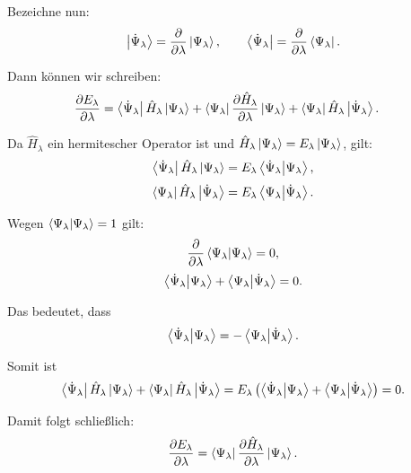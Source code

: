\documentclass[a4paper,12pt]{scrartcl}
\begin{document}
Bezeichne nun:
\begin{equation}
    \ket{\dot{\Psi}_\lambda} = \frac{\partial}{\partial \lambda} \ket{\Psi_\lambda}, \qquad
    \bra{\dot{\Psi}_\lambda} = \frac{\partial}{\partial \lambda} \bra{\Psi_\lambda}.
\end{equation}

Dann können wir schreiben:
\begin{align}
    \frac{\partial E_\lambda}{\partial \lambda}
    &= \bra{\dot{\Psi}_\lambda} \hat{H}_\lambda \ket{\Psi_\lambda}
    + \bra{\Psi_\lambda} \frac{\partial \hat{H}_\lambda}{\partial \lambda} \ket{\Psi_\lambda}
    + \bra{\Psi_\lambda} \hat{H}_\lambda \ket{\dot{\Psi}_\lambda}.
\end{align}

Da $\hat{H}_\lambda$ ein hermitescher Operator ist und $\hat{H}_\lambda \ket{\Psi_\lambda} = E_\lambda \ket{\Psi_\lambda}$, gilt:
\begin{equation}
    \bra{\dot{\Psi}_\lambda} \hat{H}_\lambda \ket{\Psi_\lambda} = E_\lambda \braket{\dot{\Psi}_\lambda}{\Psi_\lambda},
\end{equation}
\begin{equation}
    \bra{\Psi_\lambda} \hat{H}_\lambda \ket{\dot{\Psi}_\lambda} = E_\lambda \braket{\Psi_\lambda}{\dot{\Psi}_\lambda}.
\end{equation}

Wegen $\braket{\Psi_\lambda}{\Psi_\lambda} = 1$ gilt:
\begin{equation}
    \frac{\partial}{\partial \lambda} \braket{\Psi_\lambda}{\Psi_\lambda} = 0,
\end{equation}
\begin{equation}
    \braket{\dot{\Psi}_\lambda}{\Psi_\lambda} + \braket{\Psi_\lambda}{\dot{\Psi}_\lambda} = 0.
\end{equation}

Das bedeutet, dass
\begin{equation}
    \braket{\dot{\Psi}_\lambda}{\Psi_\lambda} = -\braket{\Psi_\lambda}{\dot{\Psi}_\lambda}.
\end{equation}

Somit ist
\begin{equation}
    \bra{\dot{\Psi}_\lambda} \hat{H}_\lambda \ket{\Psi_\lambda} + \bra{\Psi_\lambda} \hat{H}_\lambda \ket{\dot{\Psi}_\lambda}
    = E_\lambda \left( \braket{\dot{\Psi}_\lambda}{\Psi_\lambda} + \braket{\Psi_\lambda}{\dot{\Psi}_\lambda} \right) = 0.
\end{equation}

Damit folgt schließlich:
\begin{equation}
    \frac{\partial E_\lambda}{\partial \lambda}
    = \bra{\Psi_\lambda} \frac{\partial \hat{H}_\lambda}{\partial \lambda} \ket{\Psi_\lambda}.
\end{equation}
\end{document}
